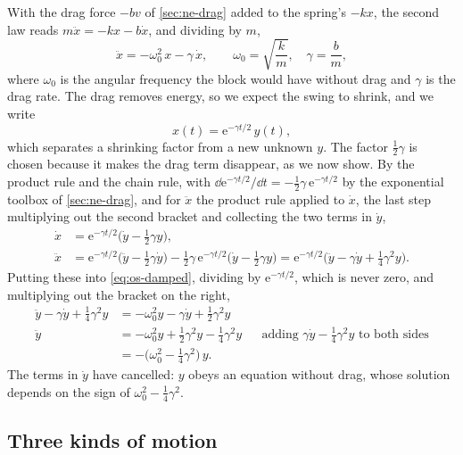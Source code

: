 With the drag force $-bv$ of \cref{sec:ne-drag} added to the spring's
$-kx$, the second law reads $m\ddot{x} = -kx - b\dot{x}$, and dividing by
$m$,
\begin{equation}
   \ddot{x} = -\omega_0^2\,x - \gamma\,\dot{x} ,
   \qquad \omega_0 = \sqrt{\frac{k}{m}} , \quad \gamma = \frac{b}{m} ,
   \label{eq:os-damped}
\end{equation}
where $\omega_0$ is the angular frequency the block would have without
drag and $\gamma$ is the drag rate. The drag removes energy, so we expect
the swing to shrink, and we write
\begin{equation*}
   x(t) = \mathrm{e}^{-\gamma t/2}\,y(t) ,
\end{equation*}
which separates a shrinking factor from a new unknown $y$. The factor
$\frac12\gamma$ is chosen because it makes the drag term disappear, as we
now show. By the product rule and the chain rule, with $\dd\mathrm{e}^{
-\gamma t/2}/\dd t = -\frac12\gamma\,\mathrm{e}^{-\gamma t/2}$ by the
exponential toolbox of \cref{sec:ne-drag}, and for $\ddot{x}$ the product
rule applied to $\dot{x}$, the last step multiplying out the second
bracket and collecting the two terms in $\dot{y}$,
\begin{align*}
   \dot{x} &= \mathrm{e}^{-\gamma t/2}\bigl(\dot{y} - \tfrac12\gamma y\bigr) ,\\
   \ddot{x} &= \mathrm{e}^{-\gamma t/2}\bigl(\ddot{y} - \tfrac12\gamma\dot{y}\bigr)
      - \tfrac12\gamma\,\mathrm{e}^{-\gamma t/2}\bigl(\dot{y}
      - \tfrac12\gamma y\bigr)
   = \mathrm{e}^{-\gamma t/2}\bigl(\ddot{y} - \gamma\dot{y}
      + \tfrac14\gamma^2 y\bigr) .
\end{align*}
Putting these into \cref{eq:os-damped}, dividing by $\mathrm{e}^{-\gamma
t/2}$, which is never zero, and multiplying out the bracket on the right,
\begin{align*}
   \ddot{y} - \gamma\dot{y} + \tfrac14\gamma^2 y
   &= -\omega_0^2 y - \gamma\dot{y} + \tfrac12\gamma^2 y\\
   \ddot{y} &= -\omega_0^2 y + \tfrac12\gamma^2 y - \tfrac14\gamma^2 y
      && \text{adding $\gamma\dot{y} - \tfrac14\gamma^2 y$ to both sides}\\
   &= -\bigl(\omega_0^2 - \tfrac14\gamma^2\bigr)\,y .
\end{align*}
The terms in $\dot{y}$ have cancelled: $y$ obeys an equation without drag,
whose solution depends on the sign of $\omega_0^2 - \frac14\gamma^2$.

\subsection*{Three kinds of motion}

